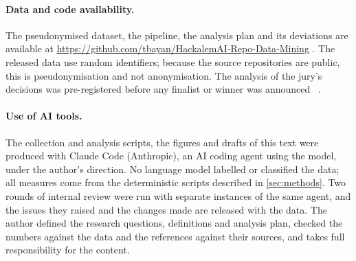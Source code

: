 \documentclass{article}
\begin{document}
\paragraph{Data and code availability.} The pseudonymised dataset, the pipeline, the analysis plan and its deviations are available at \url{https://github.com/tbayan/HackalemAI-Repo-Data-Mining} . The released data use random identifiers; because the source repositories are public, this is pseudonymisation and not anonymisation. The analysis of the jury's decisions was pre-registered before any finalist or winner was announced~\cite{vandenakker2021prereg} .

\paragraph{Use of AI tools.} The collection and analysis scripts, the figures and drafts of this text were produced with Claude Code (Anthropic), an AI coding agent using the \aimodel{} model, under the author's direction. No language model labelled or classified the data; all measures come from the deterministic scripts described in \cref{sec:methods}. Two rounds of internal review were run with separate instances of the same agent, and the issues they raised and the changes made are released with the data. The author defined the research questions, definitions and analysis plan, checked the numbers against the data and the references against their sources, and takes full responsibility for the content. 



\end{document}

